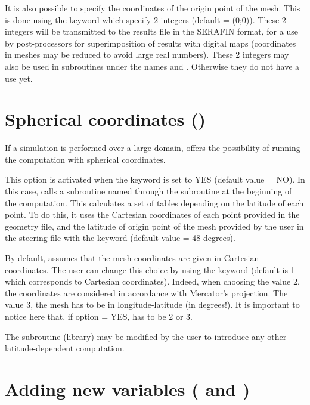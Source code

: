 It is also possible to specify the coordinates of the origin point of the mesh.
This is done using the keyword 
which specify 2 integers (default = (0;0)).
These 2 integers will be transmitted to the results file in the SERAFIN format,
for a use by post-processors for superimposition of results with digital maps
(coordinates in meshes may be reduced to avoid large real numbers).
These 2 integers may also be used in subroutines under the names
 and .
Otherwise they do not have a use yet.


\section{Spherical coordinates ()}
\label{sec:spher:coord:LATI}
If a simulation is performed over a large domain,  offers
the possibility of running the computation with spherical coordinates.

This option is activated when the keyword 
is set to YES (default value = NO).
In this case,  calls a subroutine named 
through the subroutine  at the beginning of the computation.
This calculates a set of tables depending on the latitude of each point.
To do this, it uses the Cartesian coordinates of each point provided
in the geometry file, and the latitude of origin point of the mesh
provided by the user in the steering file with the keyword
 (default value = 48 degrees).

By default,  assumes that the mesh coordinates are given
in Cartesian coordinates.
The user can change this choice by using the keyword
 (default is 1 which corresponds to Cartesian
coordinates).
Indeed, when choosing the value 2, the coordinates are considered
in accordance with Mercator's projection.
The value 3, the mesh has to be in longitude-latitude (in degrees!).
It is important to notice here that, if option 
= YES,  has to be 2 or 3.

The  subroutine (\bief library) may be modified by the user
to introduce any other latitude-dependent computation.


\section{Adding new variables (
and )}

